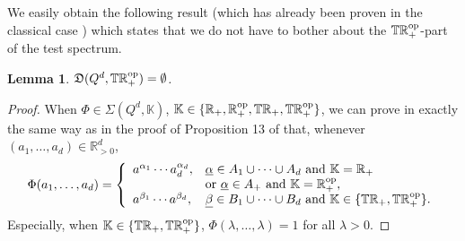 \documentclass[12pt,a4paper,reqno]{amsart}
\newtheorem{lemma}[proposition]{Lemma}
\theoremstyle{definition}
\newcommand{\mf}[1]{\mathfrak{#1}}
\newcommand{\mb}[1]{\mathbb{#1}}
\newcommand{\R}{\mathbb R}
\newcommand{\T}{\mathbb T}
\let\originalleft\left
\let\originalright\right
\renewcommand{\left}{\mathopen{}\mathclose\bgroup\originalleft}
\renewcommand{\right}{\aftergroup\egroup\originalright}
\begin{document}
We easily obtain the following result (which has already been proven in the classical case \cite{Farooq_et_al_2024,Verhagen_et_al_2024}) which states that we do not have to bother about the $\T\R_+^{\rm op}$-part of the test spectrum.

\begin{lemma}
$\mf D(Q^d,\T\R_+^{\rm op})=\emptyset$.
\end{lemma}

\begin{proof}
When $\Phi\in\Sigma(Q^d,\mb K)$, $\mb K\in\{\R_+,\R_+^{\rm op},\T\R_+,\T\R_+^{\rm op}\}$, we can prove in exactly the same way as in the proof of Proposition 13 of \cite{Farooq_et_al_2024} that, %
whenever $(a_1,\ldots,a_d)\in\R_{>0}^d$,
$$
\Phi(a_1,\ldots,a_d)=\left\{\begin{array}{ll}
a^{\alpha_1}\cdots a_d^{\alpha_d},&\underline{\alpha}\in A_1\cup\cdots\cup A_d\ {\rm and}\ \mb K=\R_+\\
&{\rm or}\ \underline{\alpha}\in A_+\ {\rm and}\ \mb K=\R_+^{\rm op},\\
a^{\beta_1}\cdots a^{\beta_d},&\underline{\beta}\in B_1\cup\cdots\cup B_d\ {\rm and}\ \mb K\in\{\T\R_+,\T\R_+^{\rm op}\}.
\end{array}\right.
$$
Especially, when $\mb K\in\{\T\R_+,\T\R_+^{\rm op}\}$, $\Phi(\lambda,\ldots,\lambda)=1$ for all $\lambda>0$.


\end{proof}
\end{document}
